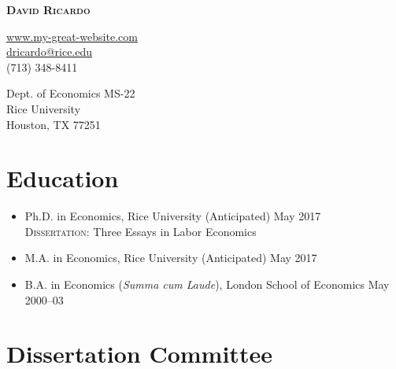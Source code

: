 \documentclass{article}[12]
\makeatletter
\newcommand{\email}[1]{\href{mailto:#1}{#1}}
\newcommand{\forceindent}{\leavevmode{\parindent=24pt\indent}}
\newcommand{\myname}{David Ricardo}
\newcommand{\myemail}{dricardo@rice.edu}
\newcommand{\mywebsite}{http://www.my-great-website.com}
\newcommand{\mywebsiteNoWww}{www.my-great-website.com}
\newcommand{\myphone}{(713) 348-8411}
\newcommand{\myaddress}{
Dept. of Economics MS-22 \\ 
Rice University \\ 
Houston, TX 77251}
\makeatother
\begin{document}
\thispagestyle{empty}

\begin{center}
{ \bfseries\Large\scshape \myname}   \\[4pt]
\end{center}

\begin{minipage}[t]{0.48\textwidth}
    \href{\mywebsite}{\mywebsiteNoWww} \\
    \email{\myemail}  \\ 
    \myphone \\ 
\end{minipage}
\hfill
\begin{minipage}[t]{0.48\textwidth}
    \begin{flushright}
    \myaddress
    \end{flushright}
\end{minipage}


\vspace{-0.5cm} 

\section{Education}

\begin{itemize}
    \item Ph.D. in Economics, Rice University  \hfill (Anticipated) May 2017  \\
    \forceindent \textsc{Dissertation}: Three Essays in Labor Economics 

    \item M.A. in Economics, Rice University  \hfill (Anticipated) May 2017 

    \item B.A. in Economics (\emph{Summa cum Laude}), London School of Economics \hfill May 2000--03 
\end{itemize}

\section{Dissertation Committee}
 
\end{document}

